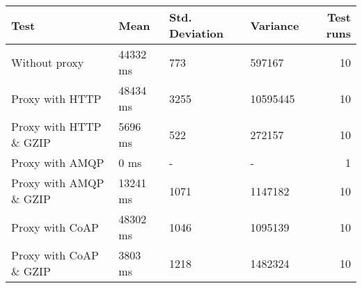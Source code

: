 \begin{tabularx}{\textwidth}{llllr}
\hline
 Test                   & Mean     & Std. Deviation   & Variance   &   Test runs \\
\hline
 Without proxy          & 44332 ms & 773              & 597167     &          10 \\
 Proxy with HTTP        & 48434 ms & 3255             & 10595445   &          10 \\
 Proxy with HTTP \& GZIP & 5696 ms  & 522              & 272157     &          10 \\
 Proxy with AMQP        & 0 ms     & -                & -          &           1 \\
 Proxy with AMQP \& GZIP & 13241 ms & 1071             & 1147182    &          10 \\
 Proxy with CoAP        & 48302 ms & 1046             & 1095139    &          10 \\
 Proxy with CoAP \& GZIP & 3803 ms  & 1218             & 1482324    &          10 \\
\hline
\end{tabularx}